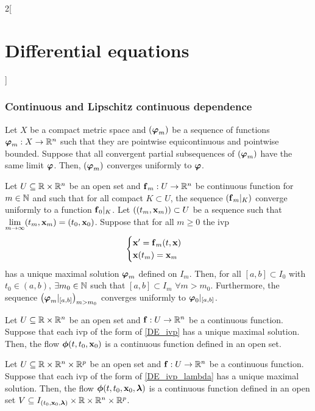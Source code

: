 \documentclass[../../../main_math.tex]{subfiles}
\begin{document}
\begin{multicols}{2}[\section{Differential equations}]
  \subsubsection{Continuous and Lipschitz continuous dependence}
  \begin{lemma}
    Let $X$ be a compact metric space and $(\boldsymbol{\mathrm{\varphi}}_m)$ be a sequence of functions $\boldsymbol{\mathrm{\varphi}}_m:X\rightarrow\mathbb{R}^n$ such that they are pointwise equicontinuous and pointwise bounded. Suppose that all convergent partial subsequences of $(\boldsymbol{\mathrm{\varphi}}_m)$ have the same limit $\boldsymbol{\mathrm{\varphi}}$. Then, $(\boldsymbol{\mathrm{\varphi}}_m)$ converges uniformly to $\boldsymbol{\mathrm{\varphi}}$.
  \end{lemma}
  \begin{proposition}
    Let $U\subseteq\mathbb{R}\times\mathbb{R}^n$ be an open set and $\boldsymbol{\mathrm{f}}_m:U\rightarrow\mathbb{R}^n$ be continuous function for $m\in\mathbb{N}$ and such that for all compact $K\subset U$, the sequence $(\boldsymbol{\mathrm{f}}_m|_K)$ converge uniformly to a function $\boldsymbol{\mathrm{f}}_0|_K$. Let $((t_m,\boldsymbol{\mathrm{x}}_m))\subset U$ be a sequence such that $\displaystyle\lim_{m\to\infty}(t_m,\boldsymbol{\mathrm{x}}_m)=(t_0,\boldsymbol{\mathrm{x}}_0)$. Suppose that for all $m\geq 0$ the ivp
    \begin{equation*}
      \begin{cases}
        \boldsymbol{\mathrm{x}}'      =\boldsymbol{\mathrm{f}}_m(t,\boldsymbol{\mathrm{x}}) \\
        \boldsymbol{\mathrm{x}}(t_m)  =\boldsymbol{\mathrm{x}}_m
      \end{cases}
    \end{equation*}
    has a unique maximal solution $\boldsymbol{\mathrm{\varphi}}_m$ defined on $I_m$. Then, for all $[a,b]\subset I_0$ with $t_0\in(a,b)$, $\exists m_0\in\mathbb{N}$ such that $[a,b]\subset I_m$ $\forall m>m_0$. Furthermore, the sequence $\left(\boldsymbol{\mathrm{\varphi}}_m|_{[a,b]}\right)_{m>m_0}$ converges uniformly to $\boldsymbol{\mathrm{\varphi}}_0|_{[a,b]}$.
  \end{proposition}
  \begin{theorem}
    Let $U\subseteq\mathbb{R}\times\mathbb{R}^n$ be an open set and $\boldsymbol{\mathrm{f}}:U\rightarrow\mathbb{R}^n$ be a continuous function. Suppose that each ivp of the form of \cref{DE_ivp} has a unique maximal solution. Then, the flow $\boldsymbol{\mathrm{\phi}}(t,t_0,\boldsymbol{\mathrm{x}}_0)$ is a continuous function defined in an open set.
  \end{theorem}
  \begin{theorem}
    Let $U\subseteq\mathbb{R}\times\mathbb{R}^n\times\mathbb{R}^p$ be an open set and $\boldsymbol{\mathrm{f}}:U\rightarrow\mathbb{R}^n$ be a continuous function. Suppose that each ivp of the form of \cref{DE_ivp_lambda} has a unique maximal solution. Then, the flow $\boldsymbol{\mathrm{\phi}}(t,t_0,\boldsymbol{\mathrm{x}}_0,\boldsymbol{\mathrm{\lambda}})$ is a continuous function defined in an open set $V\subseteq I_{(t_0,\boldsymbol{\mathrm{x}}_0,\boldsymbol{\mathrm{\lambda}})}\times\mathbb{R}\times\mathbb{R}^n\times\mathbb{R}^p$.

\end{theorem}
\end{multicols}
\end{document}
